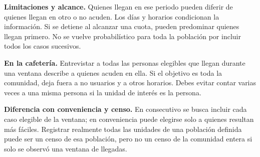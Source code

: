 \documentclass[11pt,letterpaper]{article}
\begin{document}
\textbf{Limitaciones y alcance.} Quienes llegan en ese periodo pueden diferir de quienes llegan en otro o no acuden. Los días y horarios condicionan la información. Si se detiene al alcanzar una cuota, pueden predominar quienes llegan primero. No se vuelve probabilístico para toda la población por incluir todos los casos sucesivos.

\textbf{En la cafetería.} Entrevistar a todas las personas elegibles que llegan durante una ventana describe a quienes acuden en ella. Si el objetivo es toda la comunidad, deja fuera a no usuarios y a otros horarios. Debes evitar contar varias veces a una misma persona si la unidad de interés es la persona.

\textbf{Diferencia con conveniencia y censo.} En consecutivo se busca incluir cada caso elegible de la ventana; en conveniencia puede elegirse solo a quienes resultan más fáciles. Registrar realmente todas las unidades de una población definida puede ser un censo de esa población, pero no un censo de la comunidad entera si solo se observó una ventana de llegadas.

\clearpage
\end{document}
